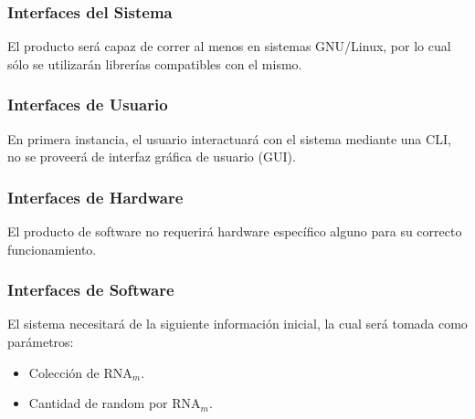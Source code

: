 \documentclass[12pt,a4paper,spanish]{article}
\begin{document}
	\subsubsection{Interfaces del Sistema}
		El producto será capaz de correr al menos en sistemas GNU/Linux, por lo cual sólo se utilizarán librerías compatibles con el mismo.

	\subsubsection{Interfaces de Usuario}		
		En primera instancia, el usuario interactuará con el sistema mediante una CLI, no se proveerá de interfaz gráfica de usuario (GUI).

	\subsubsection{Interfaces de Hardware}
		El producto de software no requerirá hardware específico alguno para su correcto funcionamiento.

	\subsubsection{Interfaces de Software}
		\par El sistema necesitará de la siguiente información inicial, la cual será tomada como parámetros:
			\begin{itemize}
				\item Colección de RNA$_m$.
				\item Cantidad de random por RNA$_m$. 				
			\end{itemize}
\end{document}
